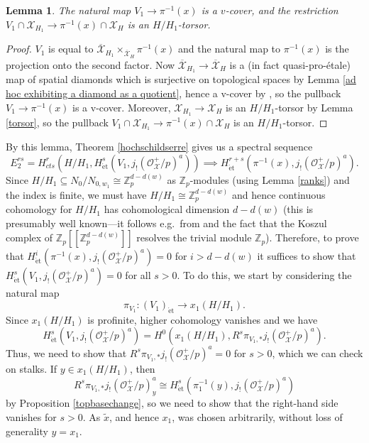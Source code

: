 \documentclass{amsart}
\newtheorem{lemma}[subsubsection]{Lemma}
\theoremstyle{remark}
\numberwithin{equation}{subsection}
\newcommand{\Z}{\ZZ}
\newcommand{\ZZ}{{\mathbb Z}}
\newcommand{\cO}{{\mathcal O}}
\newcommand{\cX}{{\mathcal X}}
\newcommand{\Zp}{\Z_p}
\newcommand{\et}{\mathrm{\acute{e}t}}
\newcommand{\ocX}{\overline{\mathcal{X}}}
\newcommand{\wt}{\widetilde}
\newcommand{\sub}{\subseteq}
\renewcommand{\(}{\left(}
\renewcommand{\)}{\right)}
\begin{document}
\begin{lemma}\label{cover pi^-1(x)}
The natural map $V_1 \to \pi^{-1}(x)$ is a $v$-cover, and the restriction $V_1\cap \cX_{H_1} \to \pi^{-1}(x) \cap \cX_{H}$ is an $H/H_1$-torsor. 
\end{lemma}

\begin{proof}
$V_1$ is equal to $\ocX_{H_1}\times_{\ocX_{H}}\pi^{-1}(x)$ and the natural map to $\pi^{-1}(x)$ is the projection onto the second factor. Now $\ocX_{H_1} \to \ocX_{H}$ is a (in fact quasi-pro-\'etale) map of spatial diamonds which is surjective on topological spaces by Lemma \ref{ad hoc exhibiting a diamond as a quotient}, hence a v-cover by \cite[Lemma 12.11]{diamonds}, so the pullback $V_1 \to \pi^{-1}(x)$ is a v-cover. Moreover, $\cX_{H_1} \to \cX_{H}$ is an $H/H_1$-torsor by Lemma \ref{torsor}, so the pullback $V_1\cap \cX_{H_1} \to \pi^{-1}(x) \cap \cX_{H}$ is an $H/H_1$-torsor.
\end{proof}

By this lemma, Theorem \ref{hochschildserre} gives us a spectral sequence
\[
 E_{2}^{rs}=H^{r}_{cts}(H/H_1,H^{s}_{\et}(V_1,j_{!}(\cO^{+}_{\cX}/p)^{a})) \implies H^{r+s}_{\et}(\pi^{-1}(x), j_{!}(\cO^{+}_{\cX}/p)^{a}).
 \]
Since $H/H_1 \sub N_{0}/N_{0,w_1}\cong \Zp^{d-d(w)}$ as $\Zp$-modules (using Lemma \ref{ranks}) and the index is finite, we must have $H/H_1 \cong \Zp^{d-d(w)}$ and hence continuous cohomology for $H/H_1$ has cohomological dimension $d-d(w)$ (this is presumably well known---it follows e.g.\ from \cite[Proposition 5.2.7]{nsw} and the fact that the Koszul complex of $\Zp[[\Zp^{d-d(w)}]]$ resolves the trivial module $\Zp$). Therefore, to prove that  $H^{i}_{\et}(\pi^{-1}(x), j_{!}(\cO^{+}_{\cX}/p)^{a})=0$ for $i>d-d(w)$ it suffices to show that $H^{s}_{\et}(V_1,j_{!}(\cO^{+}_{\cX}/p)^{a})=0$ for all $s>0$. To do this, we start by considering the natural map
\[
 \pi_{V_1} \colon (V_1)_{\et} \to x_1(H/H_1).
 \]
Since $x_1(H/H_1)$ is profinite, higher cohomology vanishes and we have
\[
 H^{s}_{\et}(V_1,j_{!}(\cO^{+}_{\cX}/p)^{a}) = H^{0}(x_1(H/H_1), R^{s}\pi_{V_1,\ast}j_{!}(\cO_{\cX}^{+}/p)^{a}).
 \]
Thus, we need to show that $R^{s}\pi_{V_1,\ast}j_{!}(\cO_{\cX}^{+}/p)^{a}=0$ for $s>0$, which we can check on stalks. If $y\in x_1(H/H_1)$, then
\[
 R^{s}\pi_{V_1,\ast}j_{!}(\cO_{\cX}^{+}/p)^{a}_{y}\cong H^{s}_{\et}(\pi_1^{-1}(y), j_{!}(\cO_{\cX}^{+}/p)^{a})
 \]
by Proposition \ref{topbasechange}, so we need to show that the right-hand side vanishes for $s>0$. As $\wt{x}$, and hence $x_1$, was chosen arbitrarily, without loss of generality $y=x_1$.
\end{document}
